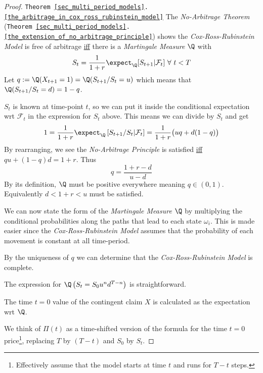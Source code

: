 \documentclass[11pt,a4paper]{article}
\begin{document}
  \begin{proof}{\texttt{Theorem \ref{sec_multi_period_models}.\ref{the_arbitrage_in_cox_ross_rubinstein_model}}}
    The \textit{No-Arbitrage Theorem} (\texttt{Theorem \ref{sec_multi_period_models}.\ref{the_extension_of_no_arbitrage_principle}}) shows the \textit{Cox-Ross-Rubinstein Model} is free of arbitrage \underline{iff} there is a \textit{Martingale Measure} $\Q$ with
    \[ S_t=\frac1{1+r}\expect_\Q[S_{t+1}|\mathcal{F}_t]\ \forall\ t<T \]
    Let $q:=\Q(X_{t+1}=1)=\Q(S_{t+1}/S_t=u)$ which means that $\Q(S_{t+1}/S_t=d)=1-q$.
    \par $S_t$ is known at time-point $t$, so we can put it inside the conditional expectation wrt $\mathcal{F}_t$ in the expression for $S_t$ above. This means we can divide by $S_t$ and get
    \[ 1=\frac1{1+r}\expect_\Q\left[S_{t+1}/S_t|\mathcal{F}_t\right]=\frac1{1+r}\big(uq+d(1-q)\big) \]
    By rearranging, we see the \textit{No-Arbitrage Principle} is satisfied \underline{iff} $qu+(1-q)d=1+r$. Thus
    \[ q=\frac{1+r-d}{u-d} \]
    By its definition, $\Q$ must be positive everywhere meaning $q\in(0,1)$. Equivalently $d<1+r<u$ must be satisfied.
    \par We can now state the form of the \textit{Martingale Measure} $\Q$ by multiplying the conditional probabilities along the paths that lead to each state $\omega_i$. This is made easier since the \textit{Cox-Ross-Rubinstein Model} assumes that the probability of each movement is constant at all time-period.
    \par By the uniqueness of $q$ we can determine that the \textit{Cox-Ross-Rubinstein Model} is complete.
    \par The expression for $\Q\left(S_t=S_0u^nd^{T-n}\right)$ is straightforward.
    \par The time $t=0$ value of the contingent claim $X$ is calculated as the expectation wrt $\Q$.
    \par We think of $\Pi(t)$ as a time-shifted version of the formula for the time $t=0$ price\footnote{Effectively assume that the model starts at time $t$ and runs for $T-t$ steps.}, replacing $T$ by $(T-t)$ and $S_0$ by $S_t$.\proved
  \end{proof}
\end{document}
